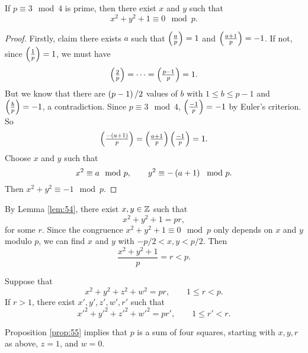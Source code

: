 
\begin{lemma}
\label{lem:54}
If $ p \equiv 3 \mod 4 $ is prime, then there exist $ x $ and $ y $ such that
$$ x^2 + y^2 + 1 \equiv 0 \mod p. $$
\end{lemma}

\begin{proof}
Firstly, claim there exists $ a $ such that $ \jacobi{a}{p} = 1 $ and $ \jacobi{a + 1}{p} = -1 $. If not, since $ \jacobi{1}{p} = 1 $, we must have
$$ \jacobi{2}{p} = \dots = \jacobi{p - 1}{p} = 1. $$
But we know that there are $ \br{p - 1} / 2 $ values of $ b $ with $ 1 \le b \le p - 1 $ and $ \jacobi{b}{p} = -1 $, a contradiction. Since $ p \equiv 3 \mod 4 $, $ \jacobi{-1}{p} = -1 $ by Euler's criterion. So
$$ \jacobi{-\br{a + 1}}{p} = \jacobi{a + 1}{p}\jacobi{-1}{p} = 1. $$
Choose $ x $ and $ y $ such that
$$ x^2 \equiv a \mod p, \qquad y^2 \equiv -\br{a + 1} \mod p. $$
Then $ x^2 + y^2 \equiv -1 \mod p $.
\end{proof}

By Lemma \ref{lem:54}, there exist $ x, y \in \mathbb{Z} $ such that
$$ x^2 + y^2 + 1 = pr, $$
for some $ r $. Since the congruence $ x^2 + y^2 + 1 \equiv 0 \mod p $ only depends on $ x $ and $ y $ modulo $ p $, we can find $ x $ and $ y $ with $ -p / 2 < x, y < p / 2 $. Then
$$ \dfrac{x^2 + y^2 + 1}{p} = r < p. $$

\begin{proposition}
\label{prop:55}
Suppose that
$$ x^2 + y^2 + z^2 + w^2 = pr, \qquad 1 \le r < p. $$
If $ r > 1 $, there exist $ x', y', z', w', r' $ such that
$$ x'^2 + y'^2 + z'^2 + w'^2 = pr', \qquad 1 \le r' < r. $$
\end{proposition}

Proposition \ref{prop:55} implies that $ p $ is a sum of four squares, starting with $ x, y, r $ as above, $ z = 1 $, and $ w = 0 $.

